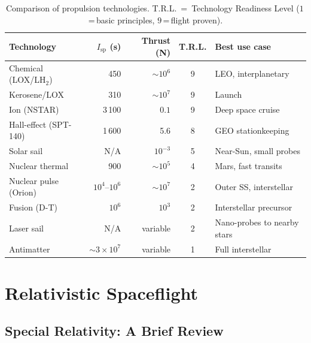 \documentclass[12pt,a4paper]{article}
\begin{document}
\begin{table}[ht]
  \centering
  \caption{Comparison of propulsion technologies.
           T.R.L.~=~Technology Readiness Level ($1$\,=\,basic principles,
           $9$\,=\,flight proven).}
  \label{tab:propulsion}
  \begin{tabularx}{\textwidth}{l r r c X}
    \toprule
    Technology & $I_{\mathrm{sp}}$ (s) & Thrust (N) & T.R.L. & Best use case \\
    \midrule
    Chemical (LOX/LH$_2$)  & 450            & $\sim\!10^6$ & 9 & LEO, interplanetary \\
    Kerosene/LOX           & 310            & $\sim\!10^7$ & 9 & Launch \\
    Ion (NSTAR)            & 3\,100         & $0.1$        & 9 & Deep space cruise \\
    Hall-effect (SPT-140)  & 1\,600         & 5.6          & 8 & GEO stationkeeping \\
    Solar sail             & N/A            & $10^{-3}$    & 5 & Near-Sun, small probes \\
    Nuclear thermal        & 900            & $\sim\!10^5$ & 4 & Mars, fast transits \\
    Nuclear pulse (Orion)  & $10^4$--$10^6$ & $\sim\!10^7$ & 2 & Outer SS, interstellar \\
    Fusion (D-T)           & $10^6$         & $10^3$       & 2 & Interstellar precursor \\
    Laser sail             & N/A            & variable     & 2 & Nano-probes to nearby stars \\
    Antimatter             & $\sim\!3\!\times\!10^7$ & variable & 1 & Full interstellar \\
    \bottomrule
  \end{tabularx}
\end{table}

\section{Relativistic Spaceflight}

\subsection{Special Relativity: A Brief Review}
\end{document}

